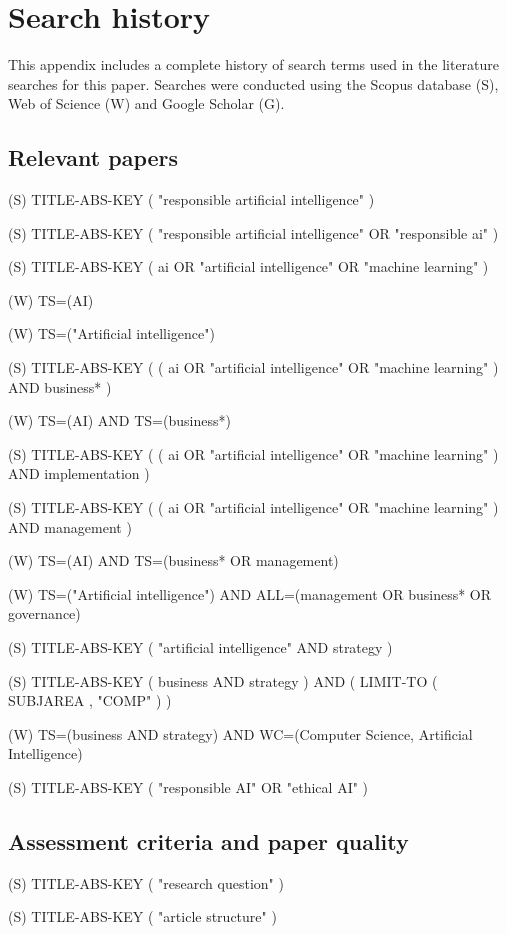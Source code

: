 \section{Search history}
This appendix includes a complete history of search terms used in the literature searches for this paper. Searches were conducted using the Scopus database (S), Web of Science (W) and Google Scholar (G).

\subsection{Relevant papers}
\label{app:paper-search}
(S) TITLE-ABS-KEY ( "responsible artificial intelligence" )

(S) TITLE-ABS-KEY ( "responsible artificial intelligence" OR "responsible ai" )

(S) TITLE-ABS-KEY ( ai OR "artificial intelligence" OR "machine learning" )

(W) TS=(AI)

(W) TS=("Artificial intelligence")

(S) TITLE-ABS-KEY ( ( ai OR "artificial intelligence" OR "machine learning" ) AND business* )

(W) TS=(AI) AND TS=(business*)

(S) TITLE-ABS-KEY ( ( ai OR "artificial intelligence" OR "machine learning" ) AND implementation )

(S) TITLE-ABS-KEY ( ( ai OR "artificial intelligence" OR "machine learning" ) AND management )

(W) TS=(AI) AND TS=(business* OR management)

(W) TS=("Artificial intelligence") AND ALL=(management OR business* OR governance)

(S) TITLE-ABS-KEY ( "artificial intelligence"  AND  strategy ) 

(S) TITLE-ABS-KEY ( business  AND strategy )  AND  ( LIMIT-TO ( SUBJAREA ,  "COMP" ) ) 

(W) TS=(business AND strategy) AND WC=(Computer Science, Artificial Intelligence)

(S) TITLE-ABS-KEY ( "responsible AI"  OR  "ethical AI" ) 

\subsection{Assessment criteria and paper quality}
\label{app:criteria-search}
(S) TITLE-ABS-KEY ( "research question" )

(S) TITLE-ABS-KEY ( "article structure" )


